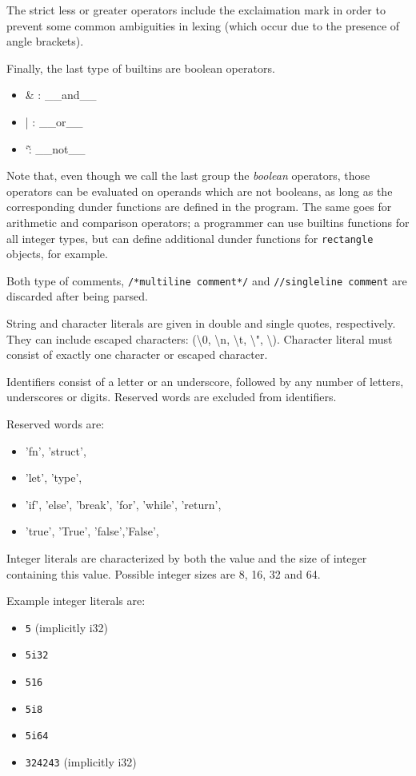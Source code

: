 \documentclass[times, utf8, diplomski]{fer}
\begin{document}
The strict less or greater operators include the exclaimation mark in order to
prevent some common ambiguities in lexing (which occur due to the presence of angle
brackets).

Finally, the last type of builtins are boolean operators.

\begin{itemize}
    \item \& : \_\_and\_\_
    \item | : \_\_or\_\_
    \item \char`\~ : \_\_not\_\_
\end{itemize}

Note that, even though we call the last group the \textit{boolean} operators,
those operators can be evaluated on operands which are not booleans,
as long as the corresponding dunder functions are defined in the program.
The same goes for arithmetic and comparison operators; a programmer can use
builtins functions for all integer types, but can define additional dunder functions
for \texttt{rectangle} objects, for example.

Both type of comments, \texttt{/*multiline comment*/} and \texttt{//singleline comment} are discarded
after being parsed.

String and character literals are given in double and single quotes, respectively.
They can include escaped characters:  (\textbackslash 0, \textbackslash n, \textbackslash t, 
\textbackslash ", \textbackslash \textquotesingle). 
Character literal must consist of exactly one character or escaped character.

Identifiers consist of a letter or an underscore, followed by any number of letters, underscores or digits.
Reserved words are excluded from identifiers.

Reserved words are:
\begin{itemize}
    \item 'fn', 'struct',
    \item 'let', 'type',
    \item 'if', 'else', 'break', 'for', 'while', 'return',
    \item 'true', 'True', 'false','False',
\end{itemize}

Integer literals are characterized by both the value and the size of integer containing this value.
Possible integer sizes are 8, 16, 32 and 64.

Example integer literals are:
\begin{itemize}
    \item \texttt{5} (implicitly i32)
    \item \texttt{5i32}
    \item \texttt{516}
    \item \texttt{5i8}
    \item \texttt{5i64}
    \item \texttt{324243} (implicitly i32)
\end{itemize}
\end{document}
